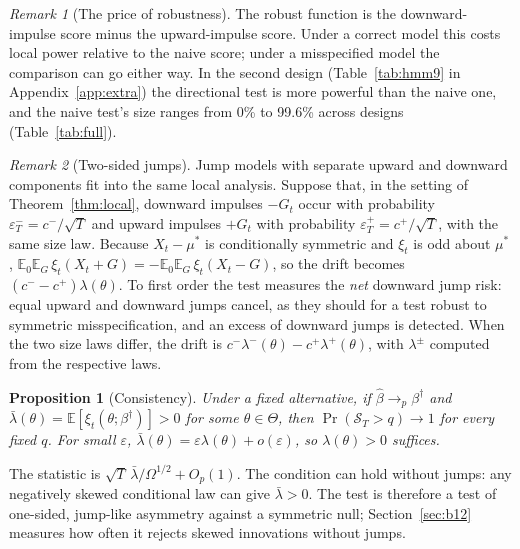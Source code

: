 \documentclass[11pt,a4paper]{article}
\newtheorem{proposition}{Proposition}
\theoremstyle{definition}
\theoremstyle{remark}
\newtheorem{remark}{Remark}
\newcommand{\E}{\mathbb{E}}
\begin{document}
\begin{remark}[The price of robustness]
The robust function is the downward-impulse score minus the upward-impulse score. Under a correct model this costs local power relative to the naive score; under a misspecified model the comparison can go either way. In the second design (Table~\ref{tab:hmm9} in Appendix~\ref{app:extra}) the directional test is more powerful than the naive one, and the naive test's size ranges from 0\% to 99.6\% across designs (Table~\ref{tab:full}).
\end{remark}

\begin{remark}[Two-sided jumps]\label{rem:twosided}
Jump models with separate upward and downward components \citep{kou2002,ramezani2007} fit into the same local analysis. Suppose that, in the setting of Theorem~\ref{thm:local}, downward impulses $-G_t$ occur with probability $\varepsilon^-_T=c^-/\sqrt T$ and upward impulses $+G_t$ with probability $\varepsilon^+_T=c^+/\sqrt T$, with the same size law. Because $X_t-\mu^*$ is conditionally symmetric and $\xi_t$ is odd about $\mu^*$, $\E_0\E_G\,\xi_t(X_t+G)=-\E_0\E_G\,\xi_t(X_t-G)$, so the drift becomes $(c^--c^+)\lambda(\theta)$. To first order the test measures the \emph{net} downward jump risk: equal upward and downward jumps cancel, as they should for a test robust to symmetric misspecification, and an excess of downward jumps is detected. When the two size laws differ, the drift is $c^-\lambda^-(\theta)-c^+\lambda^+(\theta)$, with $\lambda^\pm$ computed from the respective laws.
\end{remark}

\begin{proposition}[Consistency]\label{prop:cons}
Under a fixed alternative, if $\hat\beta\to_p\beta^\dagger$ and $\bar\lambda(\theta)=\E[\xi_t(\theta;\beta^\dagger)]>0$ for some $\theta\in\Theta$, then $\Pr(\mathcal S_T>q)\to1$ for every fixed $q$. For small $\varepsilon$, $\bar\lambda(\theta)=\varepsilon\lambda(\theta)+o(\varepsilon)$, so $\lambda(\theta)>0$ suffices.
\end{proposition}
\noindent The statistic is $\sqrt T\,\bar\lambda/\Omega^{1/2}+O_p(1)$. The condition can hold without jumps: any negatively skewed conditional law can give $\bar\lambda>0$. The test is therefore a test of one-sided, jump-like asymmetry against a symmetric null; Section~\ref{sec:b12} measures how often it rejects skewed innovations without jumps.
\end{document}
